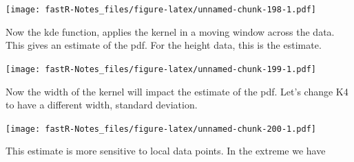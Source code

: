 \documentclass[]{book}
\newenvironment{Shaded}{\begin{snugshade}}{\end{snugshade}}
\newcommand{\KeywordTok}[1]{\textcolor[rgb]{0.13,0.29,0.53}{\textbf{#1}}}
\newcommand{\DataTypeTok}[1]{\textcolor[rgb]{0.13,0.29,0.53}{#1}}
\newcommand{\DecValTok}[1]{\textcolor[rgb]{0.00,0.00,0.81}{#1}}
\newcommand{\StringTok}[1]{\textcolor[rgb]{0.31,0.60,0.02}{#1}}
\newcommand{\OperatorTok}[1]{\textcolor[rgb]{0.81,0.36,0.00}{\textbf{#1}}}
\newcommand{\NormalTok}[1]{#1}
\theoremstyle{definition}
\theoremstyle{definition}
\theoremstyle{definition}
\theoremstyle{remark}
\begin{document}
\texttt{[image: fastR-Notes\_files/figure-latex/unnamed-chunk-198-1.pdf]}

Now the kde function, applies the kernel in a moving window across the
data. This gives an estimate of the pdf. For the height data, this is
the estimate.

\begin{Shaded}
\end{Shaded}

\texttt{[image: fastR-Notes\_files/figure-latex/unnamed-chunk-199-1.pdf]}

Now the width of the kernel will impact the estimate of the pdf. Let's
change K4 to have a different width, standard deviation.

\begin{Shaded}
\end{Shaded}

\texttt{[image: fastR-Notes\_files/figure-latex/unnamed-chunk-200-1.pdf]}

This estimate is more sensitive to local data points. In the extreme we
have
\end{document}
